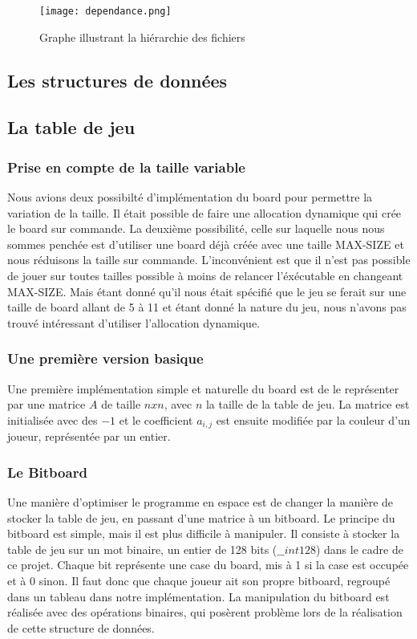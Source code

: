 \documentclass[12pt]{article}
\begin{document}
\begin{figure}[ht!]
\centering
    \texttt{[image: dependance.png]}
    \caption{Graphe illustrant la hiérarchie des fichiers}
    \label{fig:Graphe de dépendances}
\end{figure}

\subsection{Les structures de données}

\subsection{La table de jeu}
\subsubsection{Prise en compte de la taille variable}
Nous avions deux possibilté d'implémentation du board pour permettre la variation de la taille. Il était possible de faire une allocation dynamique qui crée le board sur commande. La deuxième possibilité, celle sur laquelle nous nous sommes penchée est d'utiliser une board déjà créée avec une taille MAX-SIZE et nous réduisons la taille sur commande. L'inconvénient est que il n'est pas possible de jouer sur toutes tailles possible à moins de relancer l'éxécutable en changeant MAX-SIZE. Mais étant donné qu'il nous était spécifié que le jeu se ferait sur une taille de board allant de 5 à 11 et étant donné la nature du jeu, nous n'avons pas trouvé intéressant d'utiliser l'allocation dynamique.

\subsubsection{Une première version basique}

Une première implémentation simple et naturelle du board est de le représenter par une matrice $A$ de taille $n x n$, avec $n$ la taille de la table de jeu.
La matrice est initialisée avec des $-1$ et le coefficient $a_{i,j}$ est ensuite modifiée par la couleur d'un joueur, représentée par un entier.

\subsubsection{Le Bitboard}

Une manière d'optimiser le programme en espace est de changer la manière de stocker la table de jeu, en passant d'une matrice à un bitboard. Le principe du bitboard est simple, mais il est plus difficile à manipuler. Il consiste à stocker la table de jeu sur un mot binaire, un entier de 128 bits ($\_\_int128$) dans le cadre de ce projet. Chaque bit représente une case du board, mis à 1 si la case est occupée et à 0 sinon. Il faut donc que chaque joueur ait son propre bitboard, regroupé dans un tableau dans notre implémentation.
La manipulation du bitboard est réalisée avec des opérations binaires, qui posèrent problème lors de la réalisation de cette structure de données.
\end{document}
